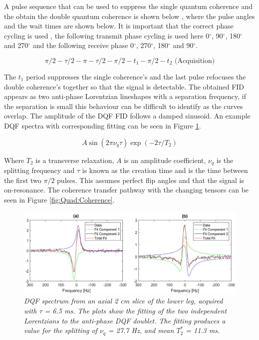 A pulse sequence that can be used to suppress the single quantum coherence and the obtain the double quantum coherence is shown below \cite{Sharf1995DetectionNMR-Spectroscopy}, where the pulse angles and the wait times are shown below. It is important that the correct phase cycling is used \cite{Bodenhausen1984SelectionExperiments}, the following transmit phase cycling is used here 0$^\circ$, 90$^\circ$, 180$^\circ$ and 270$^\circ$ and the following receive phase 0$^\circ$, 270$^\circ$, 180$^\circ$ and 90$^\circ$. 

\begin{equation}
    \pi/2-\tau/2-\pi-\tau/2-\pi/2-t_1-\pi/2-t_2 \textrm{ (Acquisition)}
    \label{eqn:Quad:Pulse}
\end{equation}

The $t_1$ period suppresses the single coherence's and the last pulse refocuses the double coherence's together so that the signal is detectable. The obtained FID appears as two anti-phase Lorentzian lineshapes with a separation frequency, if the separation is small this behaviour can be difficult to identify as the curves overlap. The amplitude of the \ac{DQF} FID follows a damped sinusoid. An example \ac{DQF} spectra with corresponding fitting can be seen in Figure \ref{fig:Quad:Ex_DQF}.

\begin{equation}
    A\sin(2\pi\nu_q\tau)\exp(-2\tau/T_2)
    \label{eqn:Quad:Amplitude}
\end{equation}

Where $T_2$ is a transverse relaxation, $A$ is an amplitude coefficient, $\nu_q$ is the splitting frequency and $\tau$ is known as the creation time and is the time between the first two $\pi/2$ pulses. This assumes perfect flip angles and that the signal is on-resonance. The coherence transfer pathway with the changing tensors can be seen in Figure \ref{fig:Quad:Coherence}.

\begin{figure}
    \centering
    \includegraphics[width=1\textwidth]{Figures/Quad/Example_DQF.png}
    \caption{\textit{\ac{DQF} spectrum from an axial 2 cm slice of the lower leg, acquired with $\tau$ = 6.5 ms. The plots show the fitting of the two independent Lorentzians to the anti-phase \ac{DQF} doublet. The fitting produces a value for the splitting of $\nu_q$ = 27.7 Hz, and mean $T_2^*$ = 11.3 ms.}}
    \label{fig:Quad:Ex_DQF}
\end{figure}

